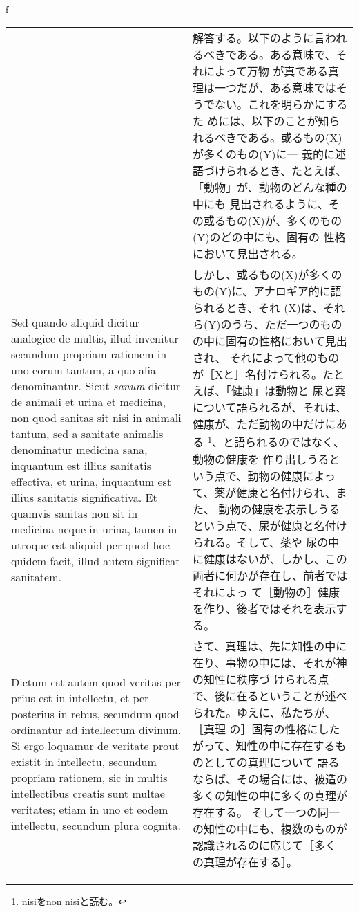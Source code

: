 \\f\documentclass[10pt]{jsarticle} %
\begin{document}
\begin{longtable}{p{21em}p{21em}}
&

解答する。以下のように言われるべきである。ある意味で、それによって万物
が真である真理は一つだが、ある意味ではそうでない。これを明らかにするた
めには、以下のことが知られるべきである。或るもの(X)が多くのもの(Y)に一
義的に述語づけられるとき、たとえば、「動物」が、動物のどんな種の中にも
見出されるように、その或るもの(X)が、多くのもの(Y)のどの中にも、固有の
性格において見出される。

\\

Sed quando aliquid dicitur analogice de multis, illud invenitur
secundum propriam rationem in uno eorum tantum, a quo alia
denominantur. Sicut {\itshape sanum} dicitur de animali et urina et
medicina, non quod sanitas sit nisi in animali tantum, sed a sanitate
animalis denominatur medicina sana, inquantum est illius sanitatis
effectiva, et urina, inquantum est illius sanitatis significativa. Et
quamvis sanitas non sit in medicina neque in urina, tamen in utroque
est aliquid per quod hoc quidem facit, illud autem significat
sanitatem.

 &

しかし、或るもの(X)が多くのもの(Y)に、アナロギア的に語られるとき、それ
(X)は、それら(Y)のうち、ただ一つのものの中に固有の性格において見出され、
それによって他のものが［Xと］名付けられる。たとえば、「健康」は動物と
尿と薬について語られるが、それは、健康が、ただ動物の中だけにある
\footnote{nisiをnon nisiと読む。}、と語られるのではなく、動物の健康を
作り出しうるという点で、動物の健康によって、薬が健康と名付けられ、また、
動物の健康を表示しうるという点で、尿が健康と名付けられる。そして、薬や
尿の中に健康はないが、しかし、この両者に何かが存在し、前者ではそれによっ
て［動物の］健康を作り、後者ではそれを表示する。

\\

Dictum est autem quod veritas per prius est in intellectu, et per
posterius in rebus, secundum quod ordinantur ad intellectum
divinum. Si ergo loquamur de veritate prout existit in intellectu,
secundum propriam rationem, sic in multis intellectibus creatis sunt
multae veritates; etiam in uno et eodem intellectu, secundum plura
cognita.

&

さて、真理は、先に知性の中に在り、事物の中には、それが神の知性に秩序づ
けられる点で、後に在るということが述べられた。ゆえに、私たちが、［真理
の］固有の性格にしたがって、知性の中に存在するものとしての真理について
語るならば、その場合には、被造の多くの知性の中に多くの真理が存在する。
そして一つの同一の知性の中にも、複数のものが認識されるのに応じて［多く
の真理が存在する］。


\end{longtable}
\end{document}
